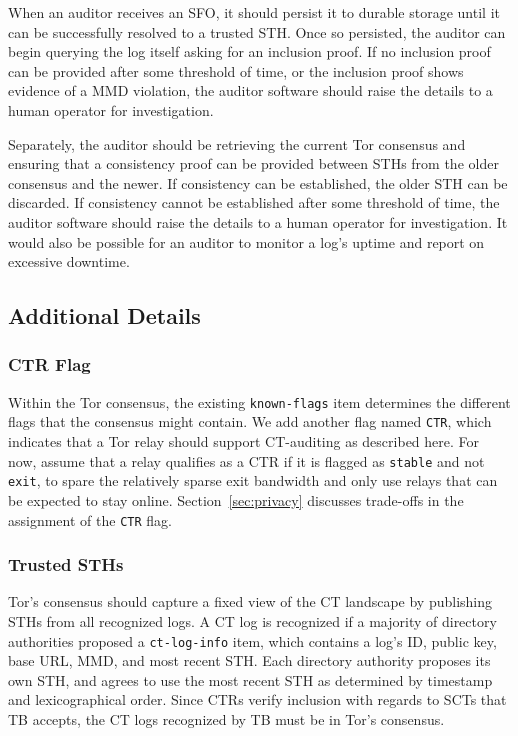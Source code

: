 When an auditor receives an SFO, it should persist it to durable storage until it can be successfully resolved to a trusted STH\@. Once so persisted, the auditor can begin querying the log itself asking for an inclusion proof. If no inclusion proof can be provided after some threshold of time, or the inclusion proof shows evidence of a MMD violation, the auditor software should raise the details to a human operator for investigation.

Separately, the auditor should be retrieving the current Tor consensus and ensuring that a consistency proof can be provided between STHs from the older consensus and the newer. If consistency can be established, the older STH can be discarded. If consistency cannot be established after some threshold of time, the auditor software should raise the details to a human operator for investigation. It would also be possible for an auditor to monitor a log's uptime and report on excessive downtime.

\subsection{Additional Details} \label{sec:base:consensus}

\subsubsection{CTR Flag} \label{sec:base:consensus:ctr-flag}
Within the Tor consensus, the existing \texttt{known-flags} item determines the
different flags that the consensus might contain.  We add another flag named
\texttt{CTR}, which indicates that a Tor relay should support CT-auditing as
described here. For now, assume that a relay qualifies as a CTR if it is flagged
as \texttt{stable} and not \texttt{exit}, to spare the relatively sparse exit
bandwidth and only use relays that can be expected to stay online.
Section~\ref{sec:privacy} discusses trade-offs in the assignment of the
\texttt{CTR} flag.

\subsubsection{Trusted STHs}
Tor's consensus should capture a fixed view of the CT landscape by publishing
STHs from all recognized logs.  A CT log is recognized if a majority of directory
authorities proposed a \texttt{ct-log-info} item, which contains a log's ID,
public key, base URL, MMD, and most recent STH\@.  Each directory authority
proposes its own STH, and agrees to use the most recent STH as determined by
timestamp and lexicographical order.  Since CTRs verify inclusion with regards
to SCTs that TB accepts, the CT logs recognized by TB must be
in Tor's consensus.

